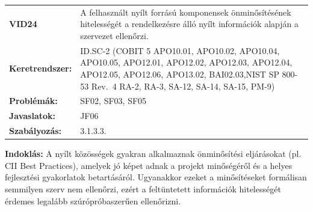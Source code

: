 \documentclass[12pt,magyar,a4paper,oneside]{scrreprt}
\begin{document}
\begin{longtable}[]{@{}ll@{}}
\toprule
\endhead
\begin{minipage}[t]{0.16\columnwidth}\raggedright
\textbf{VID24}\strut
\end{minipage} & \begin{minipage}[t]{0.79\columnwidth}\raggedright
A felhasznált nyílt forrású komponensek önminősítésének hitelességét a
rendelkezésre álló nyílt információk alapján a szervezet
ellenőrzi.\strut
\end{minipage}\tabularnewline
\begin{minipage}[t]{0.16\columnwidth}\raggedright
\textbf{Keretrendszer:}\strut
\end{minipage} & \begin{minipage}[t]{0.79\columnwidth}\raggedright
ID.SC-2 (COBIT 5 APO10.01, APO10.02, APO10.04, APO10.05, APO12.01,
APO12.02, APO12.03, APO12.04, APO12.05, APO12.06, APO13.02,
BAI02.03,NIST SP 800-53 Rev.~4 RA-2, RA-3, SA-12, SA-14, SA-15,
PM-9)\strut
\end{minipage}\tabularnewline
\begin{minipage}[t]{0.16\columnwidth}\raggedright
\textbf{Problémák:}\strut
\end{minipage} & \begin{minipage}[t]{0.79\columnwidth}\raggedright
SF02, SF03, SF05\strut
\end{minipage}\tabularnewline
\begin{minipage}[t]{0.16\columnwidth}\raggedright
\textbf{Javaslatok:}\strut
\end{minipage} & \begin{minipage}[t]{0.79\columnwidth}\raggedright
JF06\strut
\end{minipage}\tabularnewline
\begin{minipage}[t]{0.16\columnwidth}\raggedright
\textbf{Szabályozás:}\strut
\end{minipage} & \begin{minipage}[t]{0.79\columnwidth}\raggedright
3.1.3.3.\strut
\end{minipage}\tabularnewline
\bottomrule
\end{longtable}

\textbf{Indoklás: } A nyílt közösségek gyakran alkalmaznak önminősítési
eljárásokat (pl. CII Best Practices), amelyek jó képet adnak a projekt
minőségéről és a helyes fejlesztési gyakorlatok betartásáról. Ugyanakkor
ezeket a minősítéseket formálisan semmilyen szerv nem ellenőrzi, ezért a
feltüntetett információk hitelességét érdemes legalább szúrópróbaszerűen
ellenőrizni.
\end{document}
